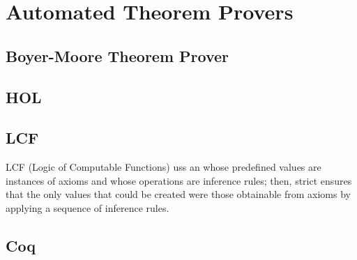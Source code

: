 \chapter{Automated Theorem Provers}

\section{Boyer-Moore Theorem Prover}

\section{HOL}

\section{LCF}
LCF (Logic of Computable Functions) uss an  
whose predefined values are instances of axioms and whose operations are 
inference rules; then, strict  ensures that the only values
that could be created were those obtainable from axioms by applying a sequence
of inference rules.

\section{Coq}


